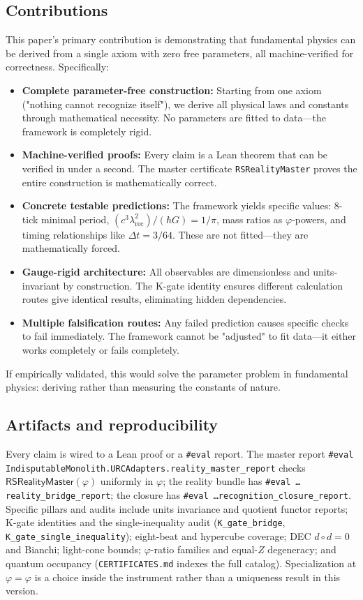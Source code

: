 \documentclass[11pt,a4paper,twoside]{article}
\numberwithin{equation}{section}
\newcommand{\phigr}{\varphi} %
\renewcommand{\phi}{\varphi}
\theoremstyle{customthm}
\theoremstyle{customdef}
\theoremstyle{customrem}
\begin{document}
\subsection{Contributions}

This paper's primary contribution is demonstrating that fundamental physics can be derived from a single axiom with zero free parameters, all machine-verified for correctness. Specifically:
\begin{itemize}
  \item \textbf{Complete parameter-free construction:} Starting from one axiom ("nothing cannot recognize itself"), we derive all physical laws and constants through mathematical necessity. No parameters are fitted to data—the framework is completely rigid.
  \item \textbf{Machine-verified proofs:} Every claim is a Lean theorem that can be verified in under a second. The master certificate \texttt{RSRealityMaster} proves the entire construction is mathematically correct.
  \item \textbf{Concrete testable predictions:} The framework yields specific values: 8-tick minimal period, $(c^3\lambda_{\mathrm{rec}}^2)/(\hbar G) = 1/\pi$, mass ratios as $\varphi$-powers, and timing relationships like $\Delta t = 3/64$. These are not fitted—they are mathematically forced.
  \item \textbf{Gauge-rigid architecture:} All observables are dimensionless and units-invariant by construction. The K-gate identity ensures different calculation routes give identical results, eliminating hidden dependencies.
  \item \textbf{Multiple falsification routes:} Any failed prediction causes specific checks to fail immediately. The framework cannot be "adjusted" to fit data—it either works completely or fails completely.
\end{itemize}
If empirically validated, this would solve the parameter problem in fundamental physics: deriving rather than measuring the constants of nature.

\subsection{Artifacts and reproducibility}

Every claim is wired to a Lean proof or a \texttt{\#eval} report. The master report \texttt{\#eval IndisputableMonolith.URCAdapters.reality\_master\_report} checks \(\mathsf{RSRealityMaster}(\phi)\) uniformly in $\phi$; the reality bundle has \texttt{\#eval \dots reality\_bridge\_report}; the closure has \texttt{\#eval \dots recognition\_closure\_report}. Specific pillars and audits include units invariance and quotient functor reports; K-gate identities and the single-inequality audit (\texttt{K\_gate\_bridge}, \texttt{K\_gate\_single\_inequality}); eight-beat and hypercube coverage; DEC \(d\circ d=0\) and Bianchi; light-cone bounds; $\varphi$-ratio families and equal-\(Z\) degeneracy; and quantum occupancy (\texttt{CERTIFICATES.md} indexes the full catalog). Specialization at $\varphi=\phigr$ is a choice inside the instrument rather than a uniqueness result in this version.
\end{document}

